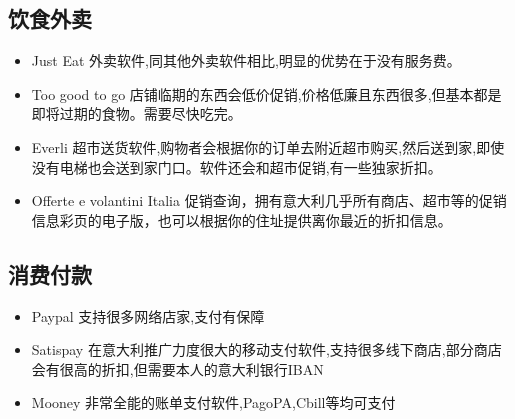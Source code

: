 \subsection{饮食外卖}
\begin{itemize}
\item Just Eat        外卖软件,同其他外卖软件相比,明显的优势在于没有服务费。
\item Too good to go  店铺临期的东西会低价促销,价格低廉且东西很多,但基本都是即将过期的食物。需要尽快吃完。
\item Everli          超市送货软件,购物者会根据你的订单去附近超市购买,然后送到家,即使没有电梯也会送到家门口。软件还会和超市促销,有一些独家折扣。
\item Offerte e volantini Italia  促销查询，拥有意大利几乎所有商店、超市等的促销信息彩页的电子版，也可以根据你的住址提供离你最近的折扣信息。
\end{itemize}

\subsection{消费付款}
\begin{itemize}
\item Paypal    支持很多网络店家,支付有保障
\item Satispay  在意大利推广力度很大的移动支付软件,支持很多线下商店,部分商店会有很高的折扣,但需要本人的意大利银行IBAN
\item Mooney    非常全能的账单支付软件,PagoPA,Cbill等均可支付
\end{itemize}



